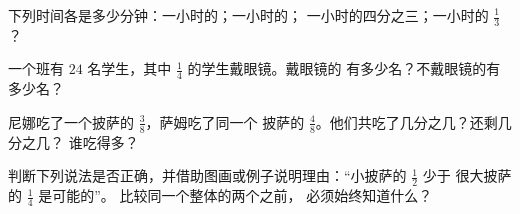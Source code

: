 \begin{exercise}[$\star$]\label{exo:g4:fractions:8}
下列时间各是多少分钟：一小时的；一小时的；
一小时的四分之三；一小时的 $\frac13$？
\end{exercise}

\begin{exercise}[$\star$]\label{exo:g4:fractions:9}
一个班有 $24$ 名学生，其中 $\frac14$ 的学生戴眼镜。戴眼镜的
有多少名？不戴眼镜的有多少名？
\end{exercise}

\begin{exercise}[$\star\star$]\label{exo:g4:fractions:10}
尼娜吃了一个披萨的 $\frac38$，萨姆吃了同一个
披萨的 $\frac48$。他们共吃了几分之几？还剩几分之几？
谁吃得多？
\end{exercise}

\begin{exercise}[$\star\star$]\label{exo:g4:fractions:11}
判断下列说法是否正确，并借助图画或例子说明理由：“小披萨的 $\frac12$ 少于
很大披萨的 $\frac14$ 是可能的”。
比较同一个整体的两个之前，
必须始终知道什么？
\end{exercise}
